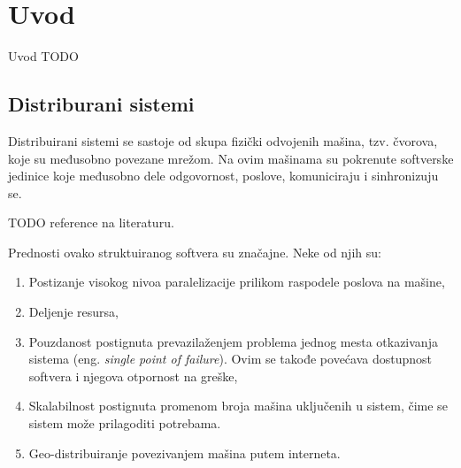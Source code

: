 \documentclass[12pt,oneside]{memoir}
\begin{document}
\frontmatter
\naslovna
\komisija
\apstrakt
\tableofcontents*

\mainmatter

\chapter{Uvod}
Uvod TODO

\section{Distriburani sistemi}

Distribuirani sistemi se sastoje od skupa fizički odvojenih mašina, tzv. čvorova, koje su međusobno povezane mrežom. Na ovim mašinama su pokrenute softverske jedinice koje međusobno dele odgovornost, poslove, komuniciraju i sinhronizuju se.

TODO reference na literaturu.

Prednosti ovako struktuiranog softvera su značajne. Neke od njih su:
\begin{enumerate}
\item Postizanje visokog nivoa paralelizacije prilikom raspodele poslova na mašine,
\item Deljenje resursa,
\item Pouzdanost postignuta prevazilaženjem problema jednog mesta otkazivanja sistema (eng. \emph{single point of failure}). Ovim se takođe povećava dostupnost softvera i njegova otpornost na greške,
\item Skalabilnost postignuta promenom broja mašina uključenih u sistem, čime se sistem može prilagoditi potrebama.
\item Geo-distribuiranje povezivanjem mašina putem interneta.
\end{enumerate}
\end{document}
